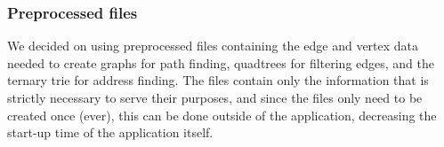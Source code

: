 \subsubsection{Preprocessed files}
We decided on using preprocessed files containing the edge and vertex data needed to create graphs for path finding, quadtrees for filtering edges, and the ternary trie for address finding. The files contain only the information that is strictly necessary to serve their purposes, and since the files only need to be created once (ever), this can be done outside of the application, decreasing the start-up time of the application itself.